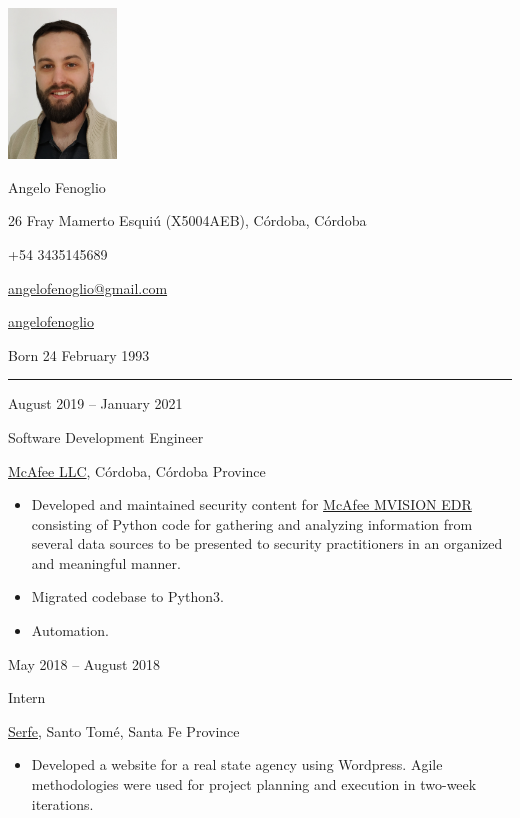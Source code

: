\documentclass[a4paper,10pt]{article}
\newlength{\cvcolumngapwidth}
\newlength{\cvleftcolumnwidth}
\newlength{\cvrightcolumnwidth}
\newcommand{\cvnamestyle}[1]{{\Huge\cvnamefont\textcolor{cvnamecolor}{#1}}}
\newcommand{\cvsectionstyle}[1]{{\normalsize\cvsectionfont\textcolor{cvsectioncolor}{#1}}}
\newcommand{\cvtitlestyle}[1]{{\large\cvtitlefont\textcolor{cvtitlecolor}{#1}}}
\newcommand{\cvdurationstyle}[1]{{\small\cvdurationfont\textcolor{cvdurationcolor}{#1}}}
\newlength{\cvafteritemskipamount}
\newlength{\cvaftersectionskipamount}
\newlength{\cvafternameskipamount}
\newlength{\cvafterpersonalinfolineskipamount}
\newlength{\cvaftertitleskipamount}
\newlength{\cvparskip}
\newcommand{\cvpersonalinfo}[2]{
    \begin{minipage}[t]{\cvleftcolumnwidth}
        \vspace{0mm} %
        \raggedleft #1
    \end{minipage}%
    \hspace{\cvcolumngapwidth}%
    \begin{minipage}[t]{\cvrightcolumnwidth}
        \vspace{0mm} %
        #2
    \end{minipage}

    \vspace{\cvafteritemskipamount}
}
\newcommand{\cvname}[1]{
    \cvnamestyle{#1}

    \vspace{\cvafternameskipamount}
}
\newcommand{\cvpersonalinfolinewithicon}[3]{
    \raisebox{.5\fontcharht\font`E-.5\height}{\texttt{[image: \#2]}}
    #3

    \vspace{\cvafterpersonalinfolineskipamount}
}
\newcommand{\cvsection}[1]{
    \begin{minipage}[t]{\cvleftcolumnwidth}
        \raggedleft\cvsectionstyle{#1}
    \end{minipage}%
    \hspace{\cvcolumngapwidth}%
    \begin{minipage}[t]{\cvrightcolumnwidth}
        \textcolor{cvrulecolor}{\rule{\cvrightcolumnwidth}{0.3mm}}
    \end{minipage}

    \vspace{\cvaftersectionskipamount}
}
\newcommand{\cvitem}[2]{
    \begin{minipage}[t]{\cvleftcolumnwidth}
        \raggedleft #1
    \end{minipage}%
    \hspace{\cvcolumngapwidth}%
    \begin{minipage}[t]{\cvrightcolumnwidth}
        \setlength{\parskip}{\cvparskip} #2
    \end{minipage}

    \vspace{\cvafteritemskipamount}
}
\newcommand{\cvtitle}[1]{
    \cvtitlestyle{#1}

    \vspace{\cvaftertitleskipamount}
    \vspace{-\cvparskip}
}
\begin{document}

\cvpersonalinfo{
    \includegraphics[height=40mm]{cvphoto.png}
}{
    \cvname{Angelo Fenoglio}

    \cvpersonalinfolinewithicon{height=4mm}{072-location.pdf}{
        26 Fray Mamerto Esquiú (X5004AEB), Córdoba, Córdoba
    }

    \cvpersonalinfolinewithicon{height=4mm}{067-phone.pdf}{
        +54 3435145689
    }

    \cvpersonalinfolinewithicon{height=4mm}{070-envelop.pdf}{
        \href{mailto:angelofenoglio@gmail.com}{angelofenoglio@gmail.com}
    }

    \cvpersonalinfolinewithicon{height=4mm}{458-linkedin.pdf}{
        \href{https://www.linkedin.com/in/angelofenoglio/}{angelofenoglio}
    }

    Born 24 February 1993
}



\cvsection{WORK EXPERIENCE}

\cvitem{
    \cvdurationstyle{August 2019 -- January 2021}
}{
    \cvtitle{Software Development Engineer}

    \href{https://www.mcafee.com/}{McAfee LLC}, Córdoba, Córdoba Province

    \begin{itemize}[leftmargin=*]
        \item Developed and maintained security content for \href{https://www.mcafee.com/enterprise/en-us/products/mvision-edr.html}{McAfee MVISION EDR} consisting of Python code for gathering and analyzing information from several data sources to be presented to security practitioners in an organized and meaningful manner. 
        \item Migrated codebase to Python3.
        \item Automation. 
    \end{itemize}
}

\cvitem{
    \cvdurationstyle{May 2018 -- August 2018}
}{
    \cvtitle{Intern}

    \href{https://www.serfe.com/en/}{Serfe}, Santo Tomé, Santa Fe Province

    \begin{itemize}[leftmargin=*]
        \item Developed a website for a real state agency using Wordpress. Agile methodologies were used for project planning and execution in two-week iterations.
    \end{itemize}
}
\end{document}
